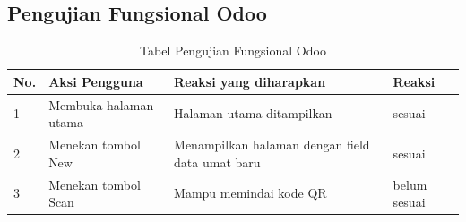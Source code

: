 \subsection{Pengujian Fungsional Odoo}

\begin{table}[H]
	\centering
	\caption{Tabel Pengujian Fungsional Odoo}
	\begin{tabular}{|p{0.5cm}| p{5cm}| p{5.5cm}| p{2.5cm}|} \hline
		No.	&	Aksi Pengguna	&	Reaksi yang diharapkan	&	Reaksi \\ \hline
		1 	&  Membuka halaman utama & Halaman utama ditampilkan &	sesuai	\\ \hline
		2 	&  Menekan tombol New & Menampilkan halaman dengan field data umat baru &	sesuai	\\ \hline
		3 	&  Menekan tombol Scan & Mampu memindai kode QR  &	belum sesuai	\\ \hline
	\end{tabular}
	\label{table:fungsionalOdoo}
\end{table}





